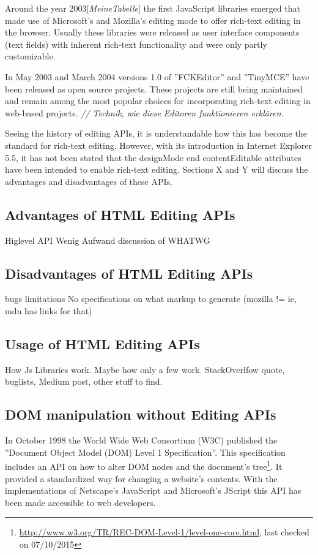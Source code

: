 Around the year 2003[\textit{MeineTabelle}] the first JavaScript libraries emerged that made use of Microsoft's and Mozilla's editing mode to offer rich-text editing in the browser. Usually these libraries were released as user interface components (text fields) with inherent rich-text functionality and were only partly customizable.

In May 2003 and March 2004 versions 1.0 of ''FCKEditor'' and ''TinyMCE'' have been released as open source projects. These projects are still being maintained and remain among the most popular choices for incorporating rich-text editing in web-based projects. \textit{// Technik, wie diese Editoren funktionieren erklären.}

Seeing the history of editing APIs, it is understandable how this has become the standard for rich-text editing. However, with its introduction in Internet Explorer 5.5, it has not been stated that the designMode end contentEditable attributes have been intended to enable rich-text editing. Sections X and Y will discuss the advantages and disadvantages of these APIs.

\subsection{Advantages of HTML Editing APIs}

Higlevel API
Wenig Aufwand
discussion of WHATWG

\subsection{Disadvantages of HTML Editing APIs}

bugs
limitations
No specifications on what markup to generate (mozilla != ie, mdn has links for that)

\subsection{Usage of HTML Editing APIs}

How Js Libraries work. Maybe how only a few work. StackOverlfow quote, buglists, Medium post, other stuff to find.

\subsection{DOM manipulation without Editing APIs}

In October 1998 the World Wide Web Consortium (W3C) published the ''Document Object Model (DOM) Level 1 Specification''. This specification includes an API on how to alter DOM nodes and the document's tree\footnote{\url{http://www.w3.org/TR/REC-DOM-Level-1/level-one-core.html}, last checked on 07/10/2015}. It provided a standardized way for changing a website's contents. With the implementations of Netscape's JavaScript and Microsoft's JScript this API has been made accessible to web developers.

